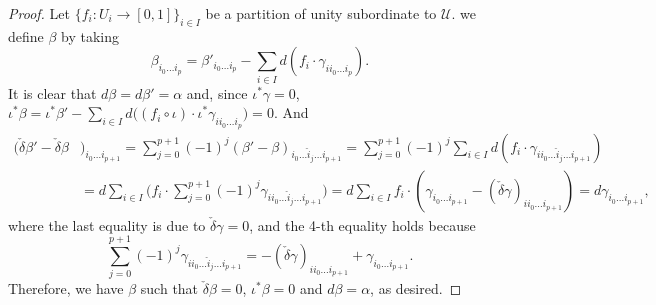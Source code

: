 \documentclass[11pt]{article}
\theoremstyle{definition}
\theoremstyle{remark}
\def\cU{\mathcal{U}}
\begin{document}
\begin{appendices}
\begin{proof}
Let $\{f_i:U_i\to[0,1]\}_{i\in I}$ be a partition of unity subordinate to $\cU$.  
we define $\beta$ by taking
$$\beta_{i_0\ldots i_{p}}
=\beta'_{i_0\ldots i_{p}}-\sum_{i\in I}d(f_i\cdot\gamma_{ii_0\ldots i_p}).
$$
It is clear that $d\beta=d\beta'=\alpha$ and, since $\iota^*\gamma=0$, $\iota^*\beta=\iota^*\beta'-\sum_{i\in I}d\big((f_i\circ{\iota})\cdot\iota^*\gamma_{ii_0\ldots i_p}\big)=0.$
And
\begin{align}\label{cech_eqn}
(\check\delta\beta'-\check\delta\beta&)_{i_0\ldots i_{p+1}}
=\sum_{j=0}^{p+1}(-1)^j(\beta'-\beta)_{i_0\ldots\hat{i}_j\ldots i_{p+1}}
=\sum_{j=0}^{p+1}(-1)^j\sum_{i\in I}d(f_i\cdot\gamma_{ii_0\ldots\hat{i}_j\ldots i_{p+1}})\nonumber\\
&=d\sum_{i\in I}\Big(f_i\cdot \sum_{j=0}^{p+1}(-1)^j\gamma_{ii_0\ldots\hat{i}_j\ldots i_{p+1}} \Big)
=d\sum_{i\in I}f_i\cdot (\gamma_{i_0\ldots i_{p+1}}-(\check\delta\gamma)_{ii_0\ldots i_{p+1}})
=d\gamma_{i_0\ldots i_{p+1}}, 
\end{align}
where the last equality is due to $\check\delta\gamma=0$, 
and the 4-th equality holds because
$$\sum_{j=0}^{p+1}(-1)^j\gamma_{ii_0\ldots\hat{i}_j\ldots i_{p+1}}=-(\check\delta\gamma)_{ii_0\ldots i_{p+1}}+\gamma_{i_0\ldots i_{p+1}}.$$
Therefore, we have $\beta$ such that $\check\delta\beta=0$, $\iota^*\beta=0$ and $d\beta=\alpha$, as desired. 


\end{proof}
\end{appendices}
\end{document}
